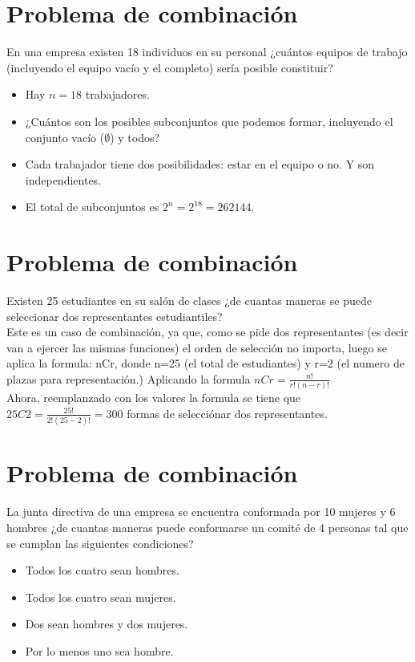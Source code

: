 \documentclass[12pt]{article}
\begin{document}
\section{Problema de combinación}

En una empresa existen 18 individuos en su personal ¿cuántos equipos de trabajo (incluyendo el equipo vacío y el completo) sería posible constituir?

\begin{itemize}
    \item Hay $n=18$ trabajadores.
    \item ¿Cuántos son los posibles subconjuntos que podemos formar, incluyendo el conjunto vacío ($\emptyset$) y todos?
    \item Cada trabajador tiene dos posibilidades: estar en el equipo o no. Y son independientes.
    \item El total de subconjuntos es $2^{n}=2^{18}=262144$.
\end{itemize}

\section{Problema de combinación}

Existen 25 estudiantes en su salón de clases ¿de cuantas maneras se puede seleccionar dos representantes estudiantiles?\\

Este es un caso de combinación, ya que, como se pide dos representantes (es decir van a ejercer las mismas funciones) el orden de selección no importa, luego se aplica la formula: nCr, donde n=25 (el total de estudiantes) y r=2 (el numero de plazas para representación.)
Aplicando la formula $nCr= \frac{n!}{r!(n-r)!}$\\

Ahora, reemplanzado con los valores la formula se tiene que $25C2= \frac{25!}{2!(25-2)!}=300$ formas de selecciónar dos representantes.

\section{Problema de combinación}

La junta directiva de una empresa se encuentra conformada por 10 mujeres y 6 hombres ¿de cuantas maneras puede conformarse un comité de 4 personas tal que se cumplan las siguientes condiciones?

\begin{itemize}
    \item Todos los cuatro sean hombres.
    \item Todos los cuatro sean mujeres.
    \item Dos sean hombres y dos mujeres.
    \item Por lo menos uno sea hombre.
\end{itemize}
\end{document}
